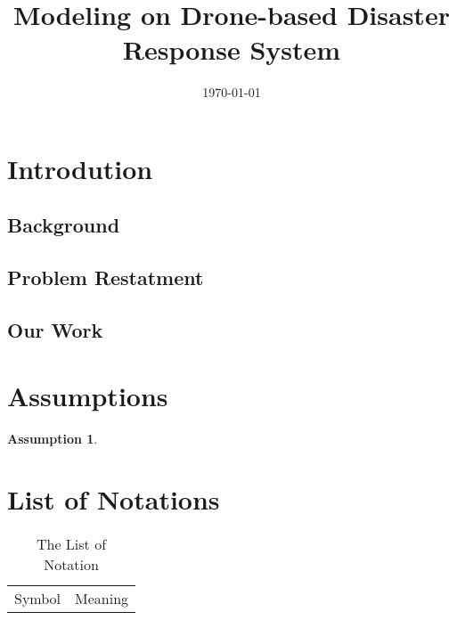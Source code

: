 \documentclass{mcmthesis}
\title{\LARGE Modeling on Drone-based Disaster Response System}
\author{ }
\date{\today}
\newtheorem{assumption}{Assumption}%
\begin{document}
    \begin{abstract}

        
    \end{abstract}

    \begin{keywords}
        
    \end{keywords}

    \maketitle
    \tableofcontents
    \section{Introdution}
    \subsection{Background}

    \subsection{Problem Restatment}

    \subsection{Our Work}

    \section{Assumptions}
    \begin{assumption}
    \end{assumption}

    \section{List of Notations}
    \begin{center}
        \begin{longtable}{cl}
            \caption{The List of Notation}
            \hline
            Symbol & Meaning
            \hline

        \end{longtable}

    \end{center}
\end{document}

